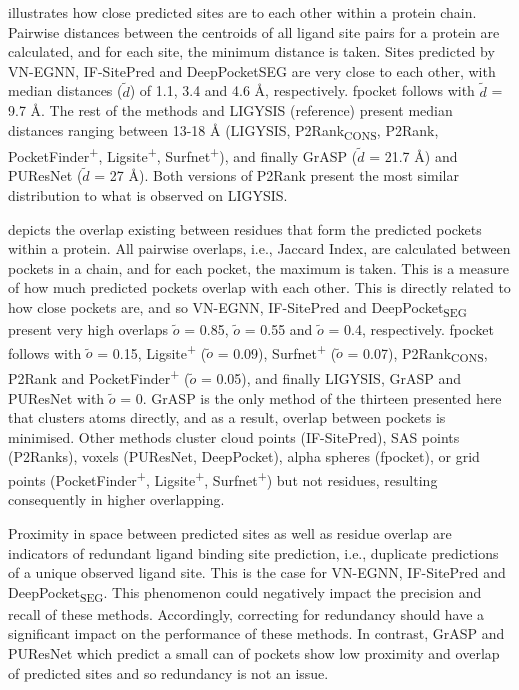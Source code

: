  illustrates how close predicted sites are to each other within a protein chain. Pairwise distances between the centroids of all ligand site pairs for a protein are calculated, and for each site, the minimum distance is taken. Sites predicted by VN-EGNN, IF-SitePred and DeepPocketSEG are very close to each other, with median distances ($\tilde{\textit{d}}$) of 1.1, 3.4 and 4.6 \AA{}, respectively. fpocket follows with $\tilde{\textit{d}}$ = 9.7 \AA{}. The rest of the methods and LIGYSIS (reference) present median distances ranging between 13-18 \AA{} (LIGYSIS, P2Rank\textsubscript{CONS}, P2Rank, PocketFinder\textsuperscript{+}, Ligsite\textsuperscript{+}, Surfnet\textsuperscript{+}), and finally GrASP ($\tilde{\textit{d}}$ = 21.7 \AA{}) and PUResNet ($\tilde{\textit{d}}$ = 27 \AA{}). Both versions of P2Rank present the most similar distribution to what is observed on LIGYSIS.

 depicts the overlap existing between residues that form the predicted pockets within a protein. All pairwise overlaps, i.e., Jaccard Index, are calculated between pockets in a chain, and for each pocket, the maximum is taken. This is a measure of how much predicted pockets overlap with each other. This is directly related to how close pockets are, and so VN-EGNN, IF-SitePred and DeepPocket\textsubscript{SEG} present very high overlaps $\tilde{\textit{o}}$ = 0.85, $\tilde{\textit{o}}$ = 0.55 and $\tilde{\textit{o}}$ = 0.4, respectively. fpocket follows with $\tilde{\textit{o}}$ = 0.15, Ligsite\textsuperscript{+} ($\tilde{\textit{o}}$ = 0.09), Surfnet\textsuperscript{+} ($\tilde{\textit{o}}$ = 0.07), P2Rank\textsubscript{CONS}, P2Rank and PocketFinder\textsuperscript{+} ($\tilde{\textit{o}}$ = 0.05), and finally LIGYSIS, GrASP and PUResNet with $\tilde{\textit{o}}$ = 0. GrASP is the only method of the thirteen presented here that clusters atoms directly, and as a result, overlap between pockets is minimised. Other methods cluster cloud points (IF-SitePred), SAS points (P2Ranks), voxels (PUResNet, DeepPocket), alpha spheres (fpocket), or grid points (PocketFinder\textsuperscript{+}, Ligsite\textsuperscript{+}, Surfnet\textsuperscript{+}) but not residues, resulting consequently in higher overlapping.

Proximity in space between predicted sites as well as residue overlap are indicators of redundant ligand binding site prediction, i.e., duplicate predictions of a unique observed ligand site. This is the case for VN-EGNN, IF-SitePred and DeepPocket\textsubscript{SEG}. This phenomenon could negatively impact the precision and recall of these methods. Accordingly, correcting for redundancy should have a significant impact on the performance of these methods. In contrast, GrASP and PUResNet which predict a small can of pockets show low proximity and overlap of predicted sites and so redundancy is not an issue.

